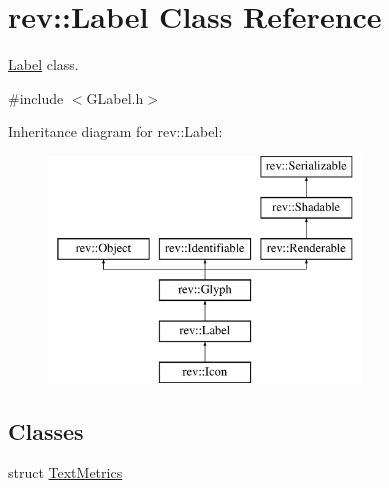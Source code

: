 \hypertarget{classrev_1_1_label}{}\section{rev\+::Label Class Reference}
\label{classrev_1_1_label}


\mbox{\hyperlink{classrev_1_1_label}{Label}} class.  




{\ttfamily \#include $<$G\+Label.\+h$>$}

Inheritance diagram for rev\+::Label\+:\begin{figure}[H]
\begin{center}
\leavevmode
\includegraphics[height=6.000000cm]{classrev_1_1_label}
\end{center}
\end{figure}
\subsection*{Classes}
\begin{DoxyCompactItemize}
\item 
struct \mbox{\hyperlink{structrev_1_1_label_1_1_text_metrics}{Text\+Metrics}}
\end{DoxyCompactItemize}
